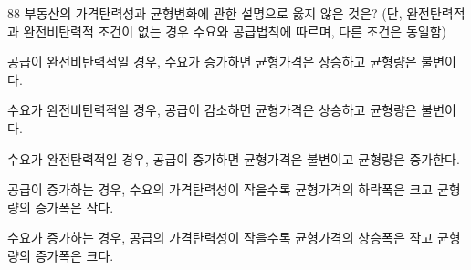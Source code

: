 \begin{question}{88}
부동산의 가격탄력성과 균형변화에 관한 설명으로 옳지 않은 것은? (단, 완전탄력적과 완전비탄력적 조건이 없는 경우 수요와 공급법칙에 따르며, 다른 조건은 동일함)
\begin{choices}
  \item 공급이 완전비탄력적일 경우, 수요가 증가하면 균형가격은 상승하고 균형량은 불변이다.
  \item 수요가 완전비탄력적일 경우, 공급이 감소하면 균형가격은 상승하고 균형량은 불변이다.
  \item 수요가 완전탄력적일 경우, 공급이 증가하면 균형가격은 불변이고 균형량은 증가한다.
  \item 공급이 증가하는 경우, 수요의 가격탄력성이 작을수록 균형가격의 하락폭은 크고 균형량의 증가폭은 작다.
  \item 수요가 증가하는 경우, 공급의 가격탄력성이 작을수록 균형가격의 상승폭은 작고 균형량의 증가폭은 크다.
\end{choices}
\end{question}
